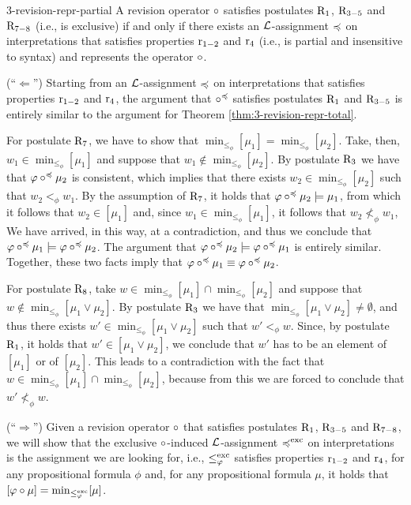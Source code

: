 \begin{thm}{}{3-revision-repr-partial}
	A revision operator $\circ$ satisfies postulates $\mathrm{R}_{1}$, $\mathrm{R}_{3-5}$ and $\mathrm{R}_{7-8}$ 
	(i.e., is exclusive)
	if and only if there exists	
	an $\mathcal{L}$-assignment $\preccurlyeq$ on interpretations
	that satisfies properties $\mathrm{r}_{1-2}$ and $\mathrm{r}_{4}$
	(i.e., is partial and insensitive to syntax) 
	and represents the operator $\circ$.
\end{thm}
\begin{prf*}{}{}%
	(``$\Leftarrow$'')
	Starting from an $\mathcal{L}$-assignment $\preccurlyeq$ on interpretations
	that satisfies properties $\mathrm{r}_{1-2}$ and $\mathrm{r}_{4}$,
	the argument that $\circ^\preccurlyeq$ satisfies postulates $\mathrm{R}_{1}$ and $\mathrm{R}_{3-5}$ is entirely similar
	to the argument for Theorem \ref{thm:3-revision-repr-total}.
	
	For postulate $\mathrm{R}_{7}$, we have to show that 
	$\min_{\le_\phi}[\mu_1]=\min_{\le_\phi}[\mu_2]$.
	Take, then, $w_1\in\min_{\le_\phi}[\mu_1]$ and suppose that $w_1\notin\min_{\le_\phi}[\mu_2]$.
	By postulate $\mathrm{R}_{3}$ we have that $\varphi\circ^\preccurlyeq\mu_2$ is consistent, 
	which implies that there exists $w_2\in\min_{\le_\phi}[\mu_2]$ such that 
	$w_2<_\phi w_1$.
	By the assumption of $\mathrm{R}_{7}$, it holds that $\varphi\circ^\preccurlyeq\mu_2\models\mu_1$,
	from which it follows that $w_2\in[\mu_1]$
	and, since $w_1\in\min_{\le_\phi}[\mu_1]$, it follows that $w_2\not<_\phi w_1$,
	We have arrived, in this way, at a contradiction, and thus we conclude
	that $\varphi\circ^\preccurlyeq\mu_1\models\varphi\circ^\preccurlyeq\mu_2$.
	The argument that $\varphi\circ^\preccurlyeq\mu_2\models\varphi\circ^\preccurlyeq\mu_1$ is entirely similar.
	Together, these two facts imply that $\varphi\circ^\preccurlyeq\mu_1\equiv\varphi\circ^\preccurlyeq\mu_2$.
	
	For postulate $\mathrm{R}_{8}$, take $w\in\min_{\le_\phi}[\mu_1]\cap\min_{\le_\phi}[\mu_2]$ 
	and suppose that $w\notin\min_{\le_\phi}[\mu_1\lor\mu_2]$.
	By postulate $\mathrm{R}_{3}$ we have that $\min_{\le_\phi}[\mu_1\lor\mu_2]\neq\emptyset$,
	and thus there exists $w'\in\min_{\le_\phi}[\mu_1\lor\mu_2]$ such that 
	$w'<_\phi w$. Since, by postulate $\mathrm{R}_{1}$, it holds that $w'\in[\mu_1\lor\mu_2]$,
	we conclude that $w'$ has to be an element of $[\mu_1]$ or of $[\mu_2]$.
	This leads to a contradiction with the fact that $w\in\min_{\le_\phi}[\mu_1]\cap\min_{\le_\phi}[\mu_2]$,
	because from this we are forced to conclude that $w'\not<_\phi w$.
	
	(``$\Rightarrow$'')
	Given a revision operator $\circ$ that satisfies postulates $\mathrm{R}_{1}$, $\mathrm{R}_{3-5}$ and $\mathrm{R}_{7-8}$,
	we will show that the exclusive $\circ$-induced $\mathcal{L}$-assignment $\preccurlyeq^{\operatorname{exc}}$ on interpretations 
	is the assignment we are looking for, 
	i.e., $\le^{\operatorname{exc}}_\varphi$ satisfies properties $\mathrm{r}_{1-2}$ and $\mathrm{r}_{4}$, 
	for any propositional formula $\phi$ and, for any 
	propositional formula $\mu$, 
	it holds that $[\varphi\circ\mu]={\operatorname{min}}_{\le^{\operatorname{exc}}_\varphi}[\mu]$. 


\end{prf*}
